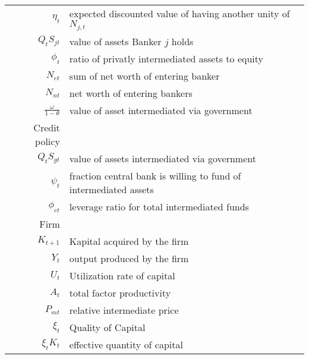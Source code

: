 \documentclass[document.tex]{subfiles}
\begin{document}
\begin{table}[H]
\begin{tabular}{rl}
$\eta_t$ & expected discounted value of having another unity of $N_{j,t}$ \\
$Q_t S_{jt}$ & value of assets Banker $j$ holds \\
 $\phi_t$ & ratio of privatly intermediated assets to equity\\
$N_{et}$ & sum of net worth of entering banker \\
$N_{nt}$ & net worth of entering bankers \\
$\frac{\omega}{1-\theta}$ & value of asset intermediated via government \\
Credit policy & \\	
$Q_t S_{gt}$ & value of assets intermediated via government \\
$\psi_t$& fraction central bank is willing to fund of intermediated assets \\
$\phi_{ct}$ & leverage ratio for total intermediated funds \\
Firm & \\
$K_{t+1}$ & Kapital acquired by the firm \\	  		
$Y_t$ & output produced by the firm \\	  	
$U_t$ & Utilization rate of capital \\
$A_t$ & total factor productivity \\	
$P_{mt}$ & relative intermediate price \\	
$\xi_t$ & Quality of Capital  \\
$\xi_t K_t $ & effective quantity of capital \\
\bottomrule
\end{tabular}
\end{table}
\end{document}

